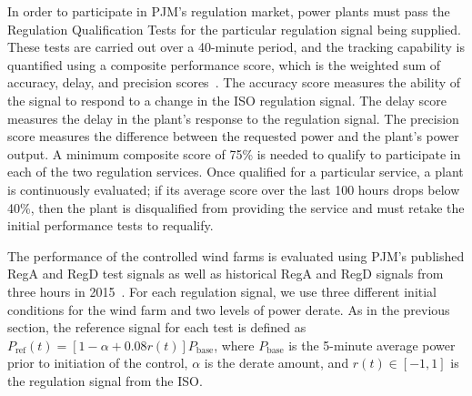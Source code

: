 In order to participate in PJM's regulation market, power plants must pass the Regulation Qualification Tests for the particular regulation signal being supplied. These tests are carried out over a 40-minute period, and the tracking capability is quantified using a composite performance score, which is the weighted sum of accuracy, delay, and precision scores~\cite{PJMm11,PJMm12}. The accuracy score measures the ability of the signal to respond to a change in the ISO regulation signal. The delay score measures the delay in the plant's response to the regulation signal. The precision score measures the difference between the requested power and the plant's power output. A minimum composite score of 75\% is needed to qualify to participate in each of the two regulation services. Once qualified for a particular service, a plant is continuously evaluated; if its average score over the last 100 hours drops below 40\%, then the plant is disqualified from providing the service and must retake the initial performance tests to requalify. 

The performance of the controlled wind farms is evaluated using PJM's published RegA and RegD test signals as well as historical RegA and RegD signals from three hours in 2015~\cite{PJMm11,PJMm12, PJM2018a}. For each regulation signal, we use three different initial conditions for the wind farm and two levels of power derate. As in the previous section, the reference signal for each test is defined as $P_\text{ref}(t) = [1 - \alpha + 0.08r(t)]P_\text{base}$, where $P_\text{base}$ is the 5-minute average power prior to initiation of the control, $\alpha$ is the derate amount, and $r(t) \in [-1,1]$ is the regulation signal from the ISO. 

